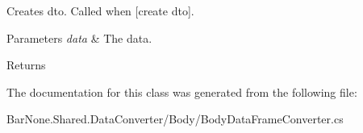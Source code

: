 Creates dto. Called when \mbox{[}create dto\mbox{]}. 


\begin{DoxyParams}{Parameters}
{\em data} & The data.\\
\hline
\end{DoxyParams}
\begin{DoxyReturn}{Returns}

\end{DoxyReturn}


The documentation for this class was generated from the following file\+:\begin{DoxyCompactItemize}
\item 
Bar\+None.\+Shared.\+Data\+Converter/\+Body/Body\+Data\+Frame\+Converter.\+cs\end{DoxyCompactItemize}
